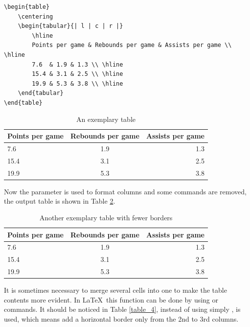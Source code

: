 	\begin{minipage}{\linewidth}
		\begin{lstlisting}
\begin{table}
	\centering
	\begin{tabular}{| l | c | r |}
		\hline
		Points per game & Rebounds per game & Assists per game \\ \hline
		7.6  & 1.9 & 1.3 \\ \hline
		15.4 & 3.1 & 2.5 \\ \hline
		19.9 & 5.3 & 3.8 \\ \hline
	\end{tabular}
\end{table}
		\end{lstlisting}
	\end{minipage}

	
	\begin{table}[h!]
		\centering
		\begin{tabular}{| l | c | r |}
			\hline
			Points per game & Rebounds per game & Assists per game \\ \hline
			7.6  & 1.9 & 1.3 \\ \hline
			15.4 & 3.1 & 2.5 \\ \hline
			19.9 & 5.3 & 3.8 \\ \hline
		\end{tabular}
		\caption{An exemplary table}
		\label{table_1}
	\end{table}
	
	Now the parameter {} is used to format columns and some {\color{blue}{\verb|\hline|}} commands are removed, the output table is shown in Table \ref{table_2}.
	
	\begin{table}[h!]
		\centering
		\begin{tabular}{| l  c  r |}
			\hline
			Points per game & Rebounds per game & Assists per game \\ \hline
			7.6  & 1.9 & 1.3 \\ 
			15.4 & 3.1 & 2.5 \\
			19.9 & 5.3 & 3.8 \\ \hline 
		\end{tabular}
		\caption{Another exemplary table with fewer borders}
		\label{table_2}
	\end{table}

	It is sometimes necessary to merge several cells into one to make the table contents more evident. In \LaTeX~this function can be done by using {} or {} commands. It should be noticed in Table \ref{table_4}, instead of using simply {\color{blue}{\verb|\hline|}}, {} is used, which means add a horizontal border only from the 2nd to 3rd columns.
	
